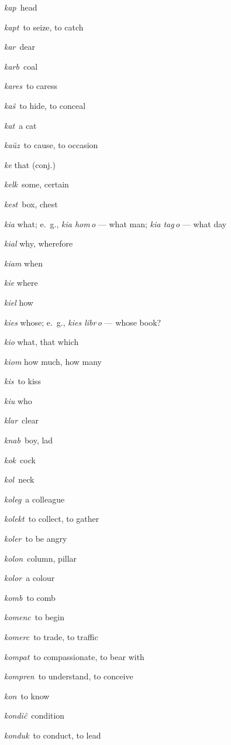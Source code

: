 \begin{landscape}
\begin{multicols}{5}
\begin{outdent}{1em}
\emph{kap\,} head

\emph{kapt\,} to seize, to catch

\emph{kar\,} dear

\emph{karb\,} coal

\emph{kares\,} to caress

\emph{kaŝ\,} to hide, to conceal

\emph{kat\,} a cat

\emph{kaŭz\,} to cause, to occasion

\emph{ke} that (conj.)

\emph{kelk\,} some, certain

\emph{kest\,} box, chest

\emph{kia} what; e.~g., \emph{kia hom\,o} — what man; \emph{kia tag\,o} — what day

\emph{kial} why, wherefore

\emph{kiam} when

\emph{kie} where

\emph{kiel} how

\emph{kies} whose; e.~g., \emph{kies libr\,o} — whose book?

\emph{kio} what, that which

\emph{kiom} how much, how many

\emph{kis\,} to kiss

\emph{kiu} who

\emph{klar\,} clear

\emph{knab\,} boy, lad

\emph{kok\,} cock

\emph{kol\,} neck

\emph{koleg\,} a colleague

\emph{kolekt\,} to collect, to gather

\emph{koler\,} to be angry

\emph{kolon\,} column, pillar

\emph{kolor\,} a colour

\emph{komb\,} to comb

\emph{komenc\,} to begin

\emph{komerc\,} to trade, to traffic

\emph{kompat\,} to compassionate, to bear with

\emph{kompren\,} to understand, to conceive

\emph{kon\,} to know

\emph{kondiĉ\,} condition

\emph{konduk\,} to conduct, to lead


\end{outdent}
\end{multicols}
\end{landscape}
